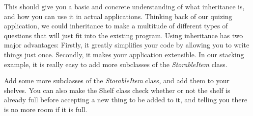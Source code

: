 \documentclass[11pt,fleqn]{book} %
\begin{document}
\begin{remark}
	This should give you a basic and concrete understanding of what inheritance is, and how you can use it in actual applications.
	Thinking back of our quizing application, we could inheritance to make a multitude of different types of questions that will just fit into the existing program.
	Using inheritance has two major advantages: Firstly, it greatly simplifies your code by allowing you to write things just once. Secondly, it makes your application extensible. In our 			stacking example, it is really easy to add more subclasses of the \emph{StorableItem} class.
\end{remark}

\begin{exercise}
	Add some more subclasses of the \emph{StorableItem} class, and add them to your shelves. You can also make the Shelf class check whether or not the shelf is already full before 			accepting a new thing to be added to it, and telling you there is no more room if it is full.
\end{exercise}

\end{document}

